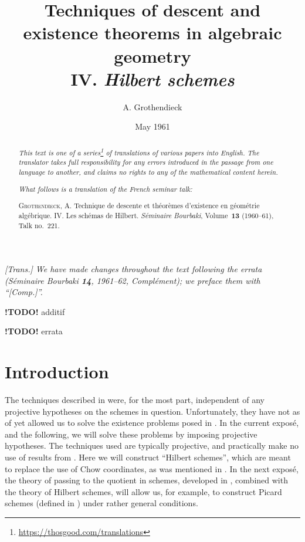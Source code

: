 \documentclass{article}
\title{Techniques of descent and existence theorems in algebraic geometry\\IV. \emph{Hilbert schemes}}
\author{A. Grothendieck}
\date{May 1961}
\newcommand{\doctype}{French seminar talk}
\newcommand{\origcit}{%
  \textsc{Grothendieck, A.}
  Technique de descente et th\'{e}or\`{e}mes d'existence en g\'{e}om\'{e}trie alg\'{e}brique. IV. Les sch\'{e}mas de Hilbert.
  \emph{S\'{e}minaire Bourbaki}, Volume~\textbf{13} (1960--61), Talk no.~221.%
}
\newcommand{\todo}{\textbf{ !TODO! }}
\newcommand{\oldpage}[1]{\marginpar{\footnotesize$\Big\vert$ \textit{p.~#1}}}
\begin{document}
\maketitle
\thispagestyle{fancy}

\renewcommand{\abstractname}{Translator's note.}

\begin{abstract}
  \renewcommand*{\thefootnote}{\fnsymbol{footnote}}
  \emph{This text is one of a series\footnote{\url{https://thosgood.com/translations}} of translations of various papers into English.}
  \emph{The translator takes full responsibility for any errors introduced in the passage from one language to another, and claims no rights to any of the mathematical content herein.}

  \medskip
  
  \emph{What follows is a translation of the \doctype:}

  \medskip\noindent
  \origcit
\end{abstract}

\setcounter{footnote}{0}

\setcounter{tocdepth}{1}
\tableofcontents



\subsubsection*{}

\emph{[Trans.] We have made changes throughout the text following the errata (\emph{S\'{e}minaire Bourbaki} \textbf{14}, 1961--62, Compl\'{e}ment); we preface them with ``[Comp.]''.}
\medskip

\todo additif

\todo errata


\section*{Introduction}
\oldpage{221-01}

The techniques described in \cite[I and II]{2} were, for the most part, independent of any projective hypotheses on the schemes in question.
Unfortunately, they have not as of yet allowed us to solve the existence problems posed in \cite[II]{2}.
In the current expos\'{e}, and the following, we will solve these problems by imposing projective hypotheses.
The techniques used are typically projective, and practically make no use of results from \cite[I and II]{2}.
Here we will construct ``Hilbert schemes'', which are meant to replace the use of Chow coordinates, as was mentioned in \cite[II, \S2]{2}.
In the next expos\'{e}, the theory of passing to the quotient in schemes, developed in \cite[III]{2}, combined with the theory of Hilbert schemes, will allow us, for example, to construct Picard schemes (defined in \cite[II, \S3]{2}) under rather general conditions.
\end{document}
